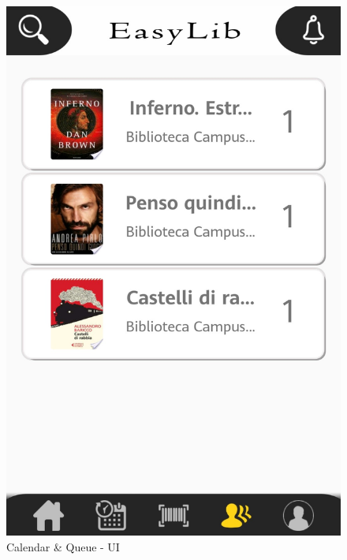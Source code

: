 \begin{figure}[H]
	\includegraphics[scale=0.15]{Images/UI/Book/5}
	\caption{Calendar \& Queue - UI}
\end{figure}


